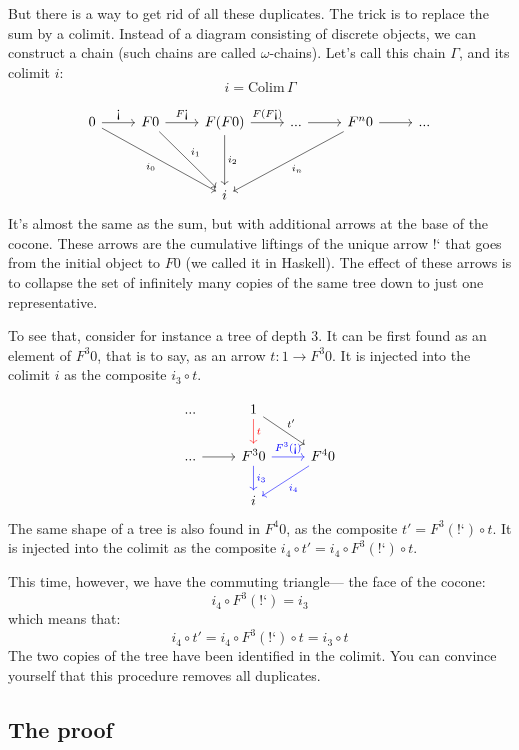 \documentclass[DaoFP]{subfiles}
\begin{document}
But there is a way to get rid of all these duplicates. The trick is to replace the sum by a colimit. Instead of a diagram consisting of discrete objects, we can construct a chain (such chains are called $\omega$-chains). Let's call this chain $\Gamma$, and its colimit $i$:
\[i = \text{Colim} \, \Gamma \]

\[
 \begin{tikzcd}
 0
 \arrow[r, "\mbox{!`}"]
 \arrow[ddrr, "i_0"']
 & F 0
  \arrow[r, "F\mbox{!`}"]
 \arrow[ddr, "i_1"]
& F (F 0)
  \arrow[r, "F(F\mbox{!`})"]
  \arrow[dd, "i_2"]
 & ...
 \arrow[r]
 & F^n 0
  \arrow[r]
 \arrow[ddll, "i_n"]
 & ...
 \\
 \\
 &&i
  \end{tikzcd}
\]
It's almost the same as the sum, but with additional arrows at the base of the cocone. These arrows are the cumulative liftings of the unique arrow $\mbox{!`}$ that goes from the initial object to $F 0$ (we called it  in Haskell). The effect of these arrows is to collapse the set of infinitely many copies of the same tree down to just one representative. 

To see that, consider for instance a tree of depth $3$. It can be first found as an element of $F^3 0$, that is to say, as an arrow $t \colon 1 \to F^3 0$. It is injected into the colimit $i$ as the composite $i_3 \circ t$. 

\[
 \begin{tikzcd}
 ...
& 1
\arrow[d, red, "t"]
\arrow[dr, "t'"]
 \\
 ...
 \arrow[r]
 & F^3 0 
 \arrow[r,  blue, "F^3 (\mbox{!`})"]
 \arrow[d, blue, "i_3"]
 & F^4 0
 \arrow[dl, blue, "i_4"]
 \\
 &  i
  \end{tikzcd}
\]
The same shape of a tree is also found in $F^4 0$, as the composite $t' = F^3 (\mbox{!`}) \circ t$. It is injected into the colimit as the composite $i_4 \circ t' = i_4 \circ F^3 (\mbox{!`}) \circ t$. 

This time, however, we have the commuting triangle--- the face of the cocone:
\[i_4 \circ F^3 (\mbox{!`}) = i_3 \]
which means that:
\[ i_4 \circ t' =  i_4 \circ F^3 (\mbox{!`}) \circ t =  i_3 \circ t\]
The two copies of the tree have been identified in the colimit. You can convince yourself that this procedure removes all duplicates.

\subsection{The proof}
\end{document}
